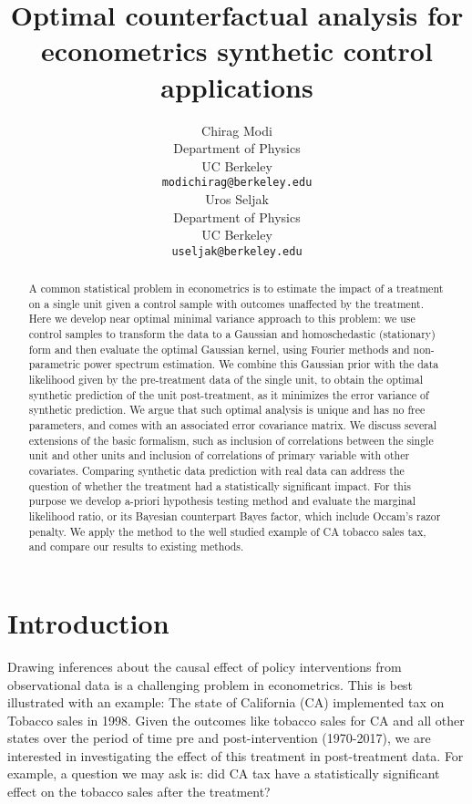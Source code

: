 \documentclass{article}
\title{Optimal counterfactual %
analysis for econometrics
synthetic control 
applications}
\author{
 Chirag Modi\\  
  Department of Physics\\
  UC Berkeley\\
  \texttt{modichirag@berkeley.edu} \\
   \And
  Uros Seljak%
  \\
  Department of Physics\\
  UC Berkeley\\
  \texttt{useljak@berkeley.edu} \\
}
\begin{document}
\maketitle

\begin{abstract}
A common statistical problem in econometrics is to estimate 
the impact of a treatment on a single unit given a control sample with outcomes unaffected by the treatment. Here we  
develop near optimal minimal variance %
approach to this problem:
we use control samples to transform the data to a Gaussian and 
homoschedastic (stationary)
form and then evaluate the 
optimal Gaussian kernel, using Fourier methods and non-parametric 
power spectrum estimation. We combine this Gaussian 
prior with the data likelihood given by the pre-treatment data of the single unit, to obtain the optimal synthetic prediction of the 
unit post-treatment, as it minimizes the error variance of synthetic prediction. 
We argue that such optimal analysis is unique and 
has no free parameters, and comes with an
associated error covariance matrix. 
We discuss several extensions of the basic
formalism, such as inclusion of correlations between the single unit 
and other units and inclusion of correlations 
of primary variable with other covariates.
Comparing synthetic data prediction with real data
can address the 
question of whether the treatment had a statistically significant impact. For this purpose  
we develop a-priori hypothesis testing method and evaluate
the marginal likelihood ratio, or its 
Bayesian counterpart Bayes factor, which 
include Occam's razor penalty. 
We apply the method to the well studied example of CA tobacco sales tax, and compare our results to existing methods. 


\end{abstract}



\section{Introduction}

Drawing inferences about the causal effect of policy interventions from observational data is a challenging problem in econometrics. This is best illustrated with an example: 
The state of California (CA) implemented tax on Tobacco sales in 1998. Given the outcomes like tobacco sales for CA and all other states over the period of time pre and post-intervention (1970-2017), we are interested in investigating the effect of this treatment in post-treatment data. For example, a question we may ask is: did CA tax have a statistically significant effect on the tobacco sales after the treatment?
\end{document}
